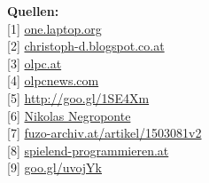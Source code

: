 \documentclass[10pt,a4paper,ngerman,twoside]{article} %
\newcommand{\SepRule}{\noindent	%
\begin{center}
\rule{250pt}{1pt} %
\end{center}
}
\begin{document}
\begin{multicols}{3}
\textbf{Quellen:} \\
{[}1{]} \href{http://one.laptop.org/}{one.laptop.org} \\
{[}2{]} \href{http://christoph-d.blogspot.co.at/}{christoph-d.blogspot.co.at} \\
{[}3{]} \href{http://olpc.at}{olpc.at} \\
{[}4{]} \href{http://www.olpcnews.com/}{olpcnews.com} \\
{[}5{]} \href{https://en.wikipedia.org/wiki/Sugar_(desktop_environment)}{http://goo.gl/1SE4Xm} \\
{[}6{]} \href{https://de.wikipedia.org/wiki/Nicholas_Negroponte}{Nikolas Negroponte} \\
{[}7{]} \href{http://www.fuzo-archiv.at/artikel/1503081v2}{fuzo-archiv.at/artikel/1503081v2} \\
{[}8{]} \href{http://spielend-programmieren.at}{spielend-programmieren.at} \\
{[}9{]} \href{http://www.olpcnews.com/commentary/olpc_news/happy_new_year_from_olpc_news.html}{goo.gl/uvojYk}
\end{multicols}
\end{document}
